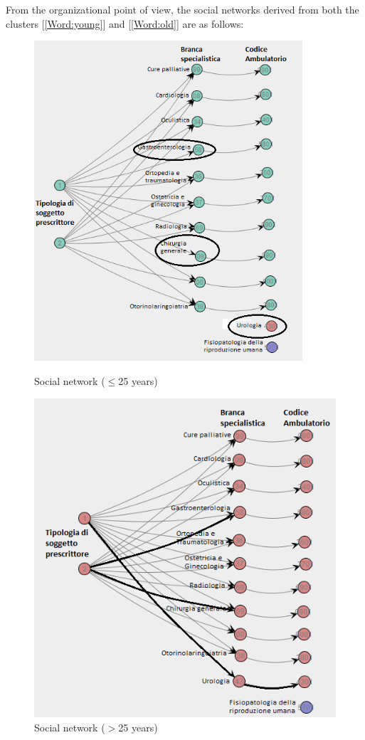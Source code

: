From the organizational point of view, the social networks derived from both the clusters [\ref{Word:young}] and [\ref{Word:old}] are as follows:
\begin{figure} [htbp]
\begin{minipage}[t]{0.5\textwidth}
\includegraphics[width=0.89\textwidth]{AmbulatoriSocialNetworkYoungs}
\caption{Social network ($\leq$25 years)}
\end{minipage}
\begin{minipage}[t]{0.5\textwidth}
\includegraphics[width=\textwidth]{AmbulatoriSocialNetworkOlds}
\caption{Social network ($>$25 years)}
\end{minipage}
\end{figure}\\
